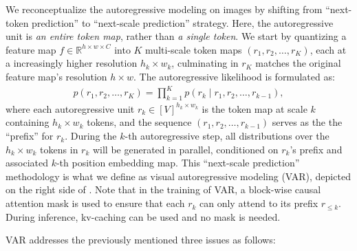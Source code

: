 We reconceptualize the autoregressive modeling on images by shifting from ``next-token prediction'' to ``next-scale prediction'' strategy.
Here, the autoregressive unit is \textit{an entire token map}, rather than \textit{a single token}.
We start by quantizing a feature map $f \in \mathbb{R}^{h\times w\times C}$ into $K$ multi-scale token maps $(r_1, r_2, \dots, r_K)$, each at a increasingly  higher resolution $h_k\times w_k$, culminating in $r_K$ matches the original feature map's resolution $h\times w$.
The autoregressive likelihood is formulated as:
\begin{align}
    p(r_1, r_2, \dots, r_K) = \prod_{k=1}^{K} p(r_k \mid r_1, r_2, \dots, r_{k-1}),  \label{eq:var}
\end{align}
where each autoregressive unit $r_k \in [V]^{h_k \times w_k}$ is the token map at scale $k$ containing $h_k \times w_k$ tokens, and the sequence $(r_1, r_2, \dots, r_{k-1})$ serves as the the ``prefix'' for $r_k$.
During the $k$-th autoregressive step, all distributions over the $h_k \times w_k$ tokens in $r_k$ will be generated in parallel, conditioned on $r_k$'s prefix and associated $k$-th position embedding map.
This ``next-scale prediction'' methodology is what we define as visual autoregressive modeling (VAR), depicted on the right side of .
Note that in the training of VAR, a block-wise causal attention mask is used to ensure that each $r_k$ can only attend to its prefix $r_{\le k}$.
During inference, kv-caching can be used and no mask is needed.



VAR addresses the previously mentioned three issues as follows:

